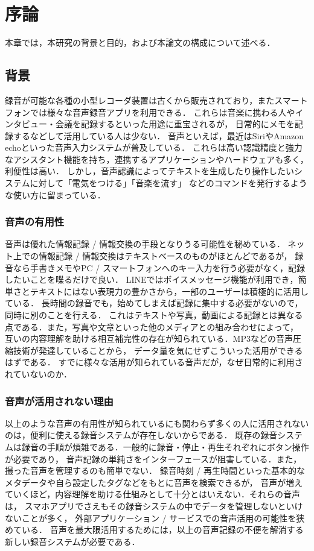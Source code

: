 \chapter{序論}
\label{chap:introduction}

本章では，本研究の背景と目的，および本論文の構成について述べる．

\newpage

\section{背景}

録音が可能な各種の小型レコーダ装置は古くから販売されており，またスマートフォンでは様々な音声録音アプリを利用できる．
これらは音楽に携わる人やインタビュー・会議を記録するといった用途に重宝されるが，
日常的にメモを記録するなどして活用している人は少ない．
音声といえば，最近はSiriやAmazon echoといった音声入力システムが普及している．
これらは高い認識精度と強力なアシスタント機能を持ち，連携するアプリケーションやハードウェアも多く，利便性は高い．
しかし，音声認識によってテキストを生成したり操作したいシステムに対して「電気をつける」「音楽を流す」
などのコマンドを発行するような使い方に留まっている．

\subsection{音声の有用性}

音声は優れた情報記録 / 情報交換の手段となりうる可能性を秘めている．
ネット上での情報記録 / 情報交換はテキストベースのものがほとんどであるが，
録音なら手書きメモやPC / スマートフォンへのキー入力を行う必要がなく，記録したいことを喋るだけで良い．
LINEではボイスメッセージ機能が利用でき，簡単さとテキストにはない表現力の豊かさから，一部のユーザーは積極的に活用している．
長時間の録音でも，始めてしまえば記録に集中する必要がないので，同時に別のことを行える．
これはテキストや写真，動画による記録とは異なる点である．また，写真や文章といった他のメディアとの組み合わせによって，
互いの内容理解を助ける相互補完性の存在が知られている\cite{Nakakura}．MP3などの音声圧縮技術が発達していることから，
データ量を気にせずこういった活用ができるはずである．
すでに様々な活用が知られている音声だが，なぜ日常的に利用されていないのか．

\subsection{音声が活用されない理由}

以上のような音声の有用性が知られているにも関わらず多くの人に活用されないのは，便利に使える録音システムが存在しないからである．
既存の録音システムは録音の手順が煩雑である．一般的に録音・停止・再生それぞれにボタン操作が必要であり，
音声記録の単純さをインターフェースが阻害している．また，撮った音声を管理するのも簡単でない．
録音時刻 / 再生時間といった基本的なメタデータや自ら設定したタグなどをもとに音声を検索できるが，
音声が増えていくほど，内容理解を助ける仕組みとして十分とはいえない．それらの音声は，
スマホアプリでさえもその録音システムの中でデータを管理しないといけないことが多く，
外部アプリケーション / サービスでの音声活用の可能性を狭めている．
音声を最大限活用するためには，以上の音声記録の不便を解消する新しい録音システムが必要である．

